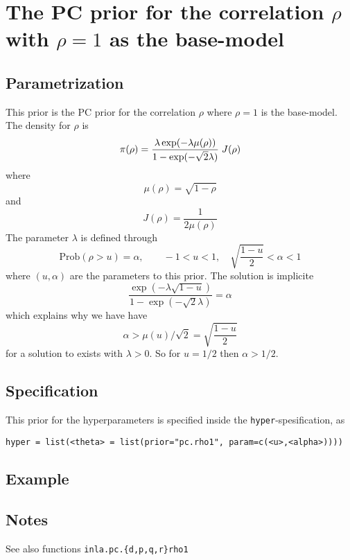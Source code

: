 \documentclass[a4paper,11pt]{article}
\begin{document}
\section*{The PC prior for the correlation $\rho$ with $\rho=1$ as the
    base-model}

\subsection*{Parametrization}
This prior is the PC prior for the correlation $\rho$ where $\rho=1$
is the base-model. The density for $\rho$ is
\begin{displaymath}
    \pi(\rho) = \frac{\lambda \exp(-\lambda \mu(\rho))}{%
        1-\exp(-\sqrt{2}\lambda)} \; J(\rho)
\end{displaymath}
where
\begin{displaymath}
    \mu(\rho) = \sqrt{1-\rho}
\end{displaymath}
and
\begin{displaymath}
    J(\rho) = \frac{1}{2\mu(\rho)}
\end{displaymath}
The parameter $\lambda$ is defined through
\begin{displaymath}
    \text{Prob}( \rho > u) = \alpha, \qquad -1 < u < 1, \quad
    \sqrt{\frac{1-u}{2}} <\alpha<1
\end{displaymath}
where $(u, \alpha{})$ are the parameters to this prior. The solution
is implicite
\begin{displaymath}
    \frac{\exp(-\lambda \sqrt{1-u})}{1-\exp(-\sqrt{2}\lambda)} = \alpha
\end{displaymath}
which explains why we have have
\begin{displaymath}
    \alpha > \mu(u)/\sqrt{2} = \sqrt{\frac{1-u}{2}}
\end{displaymath}
for a solution to exists with $\lambda > 0$. 
So for $u=1/2$ then $\alpha > 1/2$.

\subsection*{Specification}
This prior for the hyperparameters is specified inside the
\texttt{hyper}-spesification, as
\begin{center}
    \texttt{hyper = list(<theta> = list(prior="pc.rho1", param=c(<u>,<alpha>))))}
\end{center}

\subsection*{Example}

\subsection*{Notes}

See also functions \texttt{inla.pc.\{d,p,q,r\}rho1}
\end{document}

